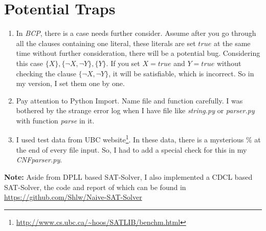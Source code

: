 \documentclass[a4paper,10pt]{article}
\begin{document}
\section{Potential Traps}
\begin{enumerate}
\setlength{\itemsep}{.1em}
\item In \textit{BCP}, there is a case needs further consider. Assume after you go through
    all the clauses containing one literal, these literals are set $true$ at
    the same time without further consideration, there will be a potential bug.
    Considering this case $\{X\},\{\neg X,\neg Y\},\{Y\}$. If you set $X=true$ and $Y=true$
    without checking the clause $\{\neg X,\neg Y\}$, it will be satisfiable, which is
    incorrect. So in my version, I set them one by one.
\item Pay attention to Python Import. Name file and function carefully.
    I was bothered by the strange error log
    when I have file like \textit{string.py} or \textit{parser.py}
    with function \textit{parse} in it.
\item I used test data from UBC 
    website\footnote{\url{http://www.cs.ubc.ca/~hoos/SATLIB/benchm.html}}.
    In these data, there is a mysterious \% at the end of every file input.
    So, I had to add a special check for this in my \textit{CNFparser.py}.
\end{enumerate}
\textbf{Note:} Aside from DPLL based SAT-Solver, I also implemented a CDCL based SAT-Solver, the code and report of which can be found in \url{https://github.com/Shlw/Naive-SAT-Solver}
\end{document}

